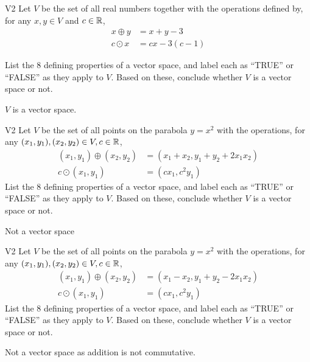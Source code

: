 \begin{problem}{V2}
Let \(V\) be the  set of all real numbers together with the operations defined by, for any \(x,y\in V\) and \(c \in \mathbb{R}\),
\begin{align*}
x\oplus y  &= x+y-3 \\
c \odot x &= cx-3(c-1)
\end{align*}

  List the 8 defining properties of a vector space, and label each as
  ``TRUE'' or ``FALSE'' as they apply to \(V\). Based on these, conclude whether
  \(V\) is a vector space or not.
\end{problem}
\begin{solution}
\(V\) is a vector space.
\end{solution}


\begin{problem}{V2}
Let \(V\) be the set of all points on the parabola \(y=x^2\) with the operations, for any \((x_1,y_1), (x_2,y_2) \in V,c \in \mathbb{R}\),
\begin{align*}
(x_1,y_1) \oplus (x_2,y_2) &= (x_1+x_2,y_1+y_2+2x_1x_2) \\
c \odot (x_1,y_1) &= (cx_1, c^2y_1)
\end{align*}
  List the 8 defining properties of a vector space, and label each as
  ``TRUE'' or ``FALSE'' as they apply to \(V\). Based on these, conclude whether
  \(V\) is a vector space or not.

\end{problem}
\begin{solution}
Not a vector space
\end{solution}

\begin{problem}{V2}
Let \(V\) be the set of all points on the parabola \(y=x^2\) with the operations, for any \((x_1,y_1), (x_2,y_2) \in V,c \in \mathbb{R}\),
\begin{align*}
(x_1,y_1) \oplus (x_2,y_2) &= (x_1-x_2,y_1+y_2-2x_1x_2) \\
c \odot (x_1,y_1) &= (cx_1, c^2y_1)
\end{align*}
  List the 8 defining properties of a vector space, and label each as
  ``TRUE'' or ``FALSE'' as they apply to \(V\). Based on these, conclude whether
  \(V\) is a vector space or not.

\end{problem}
\begin{solution}
Not a vector space as addition is not commutative.
\end{solution}


